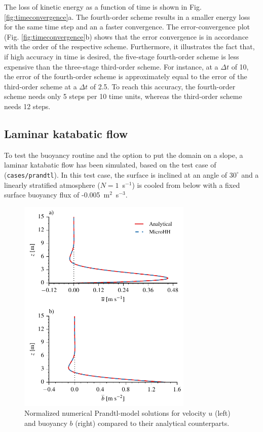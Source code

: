 \documentclass[gmd,manuscript]{copernicus}
\begin{document}
The loss of kinetic energy as a function of time is shown in Fig. \ref{fig:timeconvergence}a. The fourth-order scheme results in a smaller energy loss for the same time step and an a faster convergence. The error-convergence plot (Fig. \ref{fig:timeconvergence}b) shows that the error convergence is in accordance with the order of the respective scheme. Furthermore, it illustrates the fact that, if high accuracy in time is desired, the five-stage fourth-order scheme is less expensive than the three-stage third-order scheme. For instance, at a $\Delta t$ of 10, the error of the fourth-order scheme is approximately equal to the error of the third-order scheme at a $\Delta t$ of 2.5. To reach this accuracy, the fourth-order scheme needs only 5 steps per 10 time units, whereas the third-order scheme needs 12 steps.

\subsection{Laminar katabatic flow} \label{sec:laminarkatabatic}
To test the buoyancy routine and the option to put the domain on a slope, a laminar katabatic flow has been simulated, based on the test case of \citet{Prandtl1942} (\texttt{cases/prandtl}). In this test case, the surface is inclined at an angle of $30^{\circ}$ and a linearly stratified atmosphere ($N = 1$~s$^{-1}$) is cooled from below with a fixed surface buoyancy flux of -0.005~m$^2$~s$^{-3}$.

\begin{figure}[t]
	\vspace*{2mm}
	\begin{center}
		\includegraphics[width=8.3cm]{figs/prandtlslope.pdf}
	\end{center}
	\caption{Normalized numerical Prandtl-model solutions for velocity $u$ (left) and buoyancy $b$ (right) compared to their analytical counterparts.}
	\label{fig:prandtl}
\end{figure}
\end{document}
